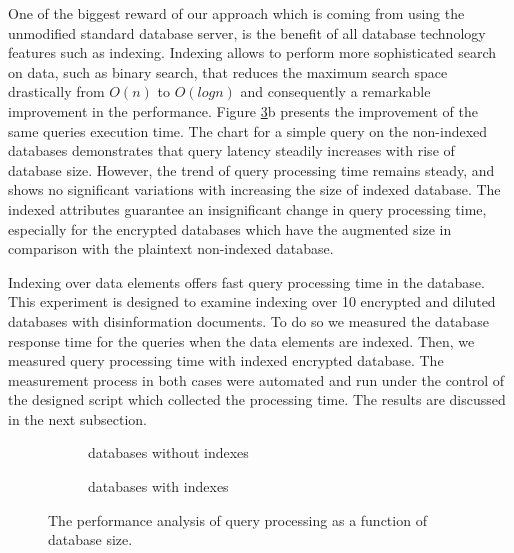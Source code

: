 One of the biggest reward of our approach which is coming from using the unmodified standard database server, is the benefit of all database technology features such as indexing. Indexing allows to perform more sophisticated search on data, such as binary search, that reduces the maximum search space drastically from $O(n)$ to $O(log n)$ and consequently a remarkable improvement in the performance. Figure \ref{queryLatencyToSize}b presents the improvement of the same queries execution time. The chart for a simple query on the non-indexed databases demonstrates that query latency steadily increases with rise of database size. However, the trend of query processing time remains steady, and shows no significant variations with increasing the size of indexed database. The indexed attributes guarantee an insignificant change in query processing time, especially for the encrypted databases which have the augmented size in comparison with the plaintext non-indexed database.

Indexing over data elements offers fast query processing time in the database. This experiment is designed to examine indexing over 10 encrypted and diluted databases with disinformation documents. To do so we measured the database response time for the queries when the data elements are indexed. Then, we measured query processing time with indexed encrypted database. The measurement process in both cases were automated and run under the control of the designed script which collected the processing time. The results are discussed in the next subsection.

\begin{figure}[H]
\begin{subfigure}{0.40\textwidth}
\centering
\resizebox{0.9\totalheight}{!}{}
\label{fig:LatencyVsSize}
\caption{databases without indexes }
\end{subfigure}
\qquad \qquad
\begin{subfigure}{0.40\textwidth}
\resizebox{0.9\totalheight}{!}{}
\label{fig:LatencyWithIndexedDB}
\caption{databases with indexes}
\end{subfigure}
\caption{The performance analysis of query processing as a function of database size. }
\label{queryLatencyToSize}
\end{figure}

